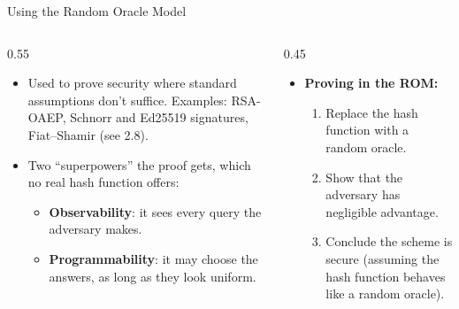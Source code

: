 \ifdefined\PRESENTATION\else\PassOptionsToClass{handout}{beamer}\fi\documentclass[aspectratio=169, lualatex]{beamer}
\begin{document}
\begin{frame}{Using the Random Oracle Model}
	\begin{columns}[c]
		\begin{column}{0.55\textwidth}
			\begin{itemize}
				\item Used to prove security where standard assumptions don't suffice. Examples: RSA-OAEP, Schnorr and Ed25519 signatures, Fiat--Shamir (see 2.8).
				\item Two ``superpowers'' the proof gets, which no real hash function offers:
				      \begin{itemize}
					      \item \textbf{Observability}: it sees every query the adversary makes.
					      \item \textbf{Programmability}: it may choose the answers, as long as they look uniform.
				      \end{itemize}
			\end{itemize}
		\end{column}
		\begin{column}{0.45\textwidth}
			\begin{itemize}
				\item \textbf{Proving in the ROM:}
				      \begin{enumerate}
					      \item Replace the hash function with a random oracle.
					      \item Show that the adversary has negligible advantage.
					      \item Conclude the scheme is secure (assuming the hash function behaves like a random oracle).
				      \end{enumerate}
			\end{itemize}
		\end{column}
	\end{columns}
\end{frame}
\end{document}
